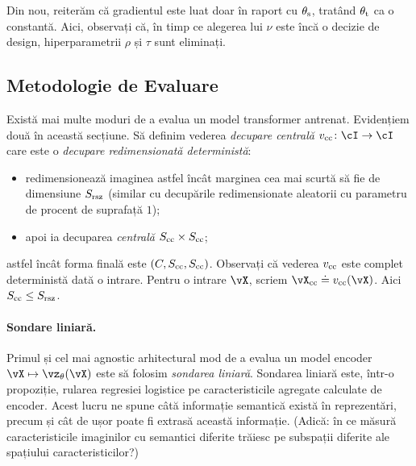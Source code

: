 \documentclass[../../book-main_ro.tex]{subfiles}
\begin{document}
Din nou, reiterăm că gradientul este luat doar în raport cu \(\theta_{\mathrm{s}}\), tratând \(\theta_{\mathrm{t}}\) ca o constantă. Aici, observați că, în timp ce alegerea lui \(\nu\) este încă o decizie de design, hiperparametrii \(\rho\) și \(\tau\) sunt eliminați.


\subsection{Metodologie de Evaluare}\label{sub:contrastive_learning_evals}
Există mai multe moduri de a evalua un model transformer antrenat. Evidențiem două în această secțiune. Să definim vederea \textit{decupare centrală} \(v_{\cc} \colon \cI \to \cI\) care este o \textit{decupare redimensionată deterministă}:
\begin{itemize}
    \item redimensionează imaginea astfel încât marginea cea mai scurtă să fie de dimensiune \(S_{\mathrm{rsz}}\) (similar cu decupările redimensionate aleatorii cu parametru de procent de suprafață \(1\));
    \item apoi ia decuparea \textit{centrală} \(S_{\mathrm{cc}} \times S_{\mathrm{cc}}\);
\end{itemize}
astfel încât forma finală este \((C, S_{\mathrm{cc}}, S_{\mathrm{cc}})\). Observați că vederea \(v_{\mathrm{cc}}\) este complet deterministă dată o intrare. Pentru o intrare \(\vX\), scriem \(\vX_{\cc} \doteq v_{\cc}(\vX)\). Aici \(S_{\mathrm{cc}} \leq S_{\mathrm{rsz}}\).


\paragraph{Sondare liniară.}

Primul și cel mai agnostic arhitectural mod de a evalua un model encoder \(\vX \mapsto \vz_{\theta}(\vX)\) este să folosim \textit{sondarea liniară}. Sondarea liniară este, într-o propoziție, rularea regresiei logistice pe caracteristicile agregate calculate de encoder. Acest lucru ne spune câtă informație semantică există în reprezentări, precum și cât de ușor poate fi extrasă această informație. (Adică: în ce măsură caracteristicile imaginilor cu semantici diferite trăiesc pe subspații diferite ale spațiului caracteristicilor?)
\end{document}

